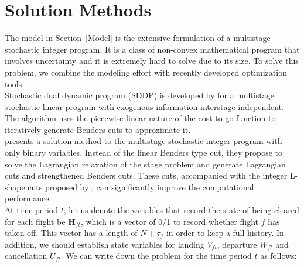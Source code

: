 \documentclass[12pt]{article}
\begin{document}
\section{Solution Methods}
	The model in Section~\ref{Model} is the extensive formulation of a multistage stochastic integer program. It is a class of non-convex mathematical program that involves uncertainty and it is extremely hard to solve due to its size. To solve this problem, we combine the modeling effort with recently developed optimization tools.\\
	\newline Stochastic dual dynamic program (SDDP) is developed by \cite{pereira1991multi} for a multistage stochastic linear program with exogenous information interstage-independent. The algorithm uses the piecewise linear nature of the cost-to-go function to iteratively generate Benders cuts to approximate it.\\
	\newline \cite{zou2016nested} presents a solution method to the multistage stochastic integer program with only binary variables. Instead of the linear Benders type cut, they propose to solve the Lagrangian relaxation of the stage problem and generate Lagrangian cuts and strengthened Benders cuts. These cuts, accompanied with the integer L-shape cuts proposed by \cite{laporte1993integer}, can significantly improve the computational performance.\\
	\newline At time period \(t\), let us denote the variables that record the state of being cleared for each flight be \(\mathbf{H}_{ft}\), which is a vector of 0/1 to record whether flight \(f\) has taken off. This vector has a length of \(N + \tau_f\) in order to keep a full history. In addition, we should establish state variables for landing \(V_{ft}\), departure \(W_{ft}\) and cancellation \(U_{ft}\). We can write down the problem for the time period \(t\) as follows:
\end{document}
